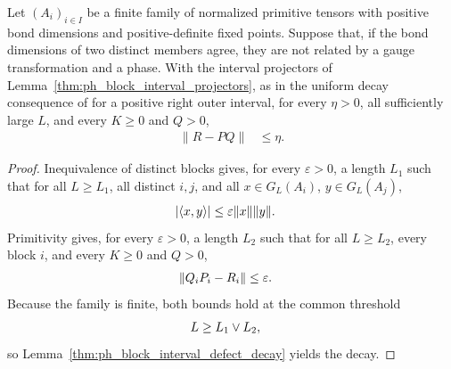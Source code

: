 \begin{lemma}
    \label{thm:ph_primitive_block_interval_defect_decay}
    \leanok
    Let $(A_i)_{i\in I}$ be a finite family of normalized primitive tensors
    with positive bond dimensions and positive-definite fixed points.
    Suppose that, if the bond dimensions of two distinct members agree, they
    are not related by a gauge transformation and a phase. With the interval
    projectors of Lemma~\ref{thm:ph_block_interval_projectors}, as in the
    uniform decay consequence of
    \cite[Lemma~6.1(ii)]{Nachtergaele1996Spectral} for a positive right outer
    interval, for every $\eta>0$, all sufficiently large $L$, and every
    $K\geq0$ and $Q>0$,
    \begin{align}
        \lVert R-PQ\rVert & \leq\eta.
    \end{align}
\end{lemma}
\begin{proof}
    \leanok
    Inequivalence of distinct blocks gives, for every $\varepsilon>0$, a
    length $L_1$ such that for all $L\ge L_1$, all distinct $i,j$, and all
    $x\in G_L(A_i)$, $y\in G_L(A_j)$,
    \begin{align}
        |\langle x,y\rangle|
         & \le\varepsilon\lVert x\rVert\lVert y\rVert.
        \notag
    \end{align}
    Primitivity gives, for every $\varepsilon>0$, a length $L_2$ such that
    for all $L\ge L_2$, every block $i$, and every $K\ge0$ and $Q>0$,
    \begin{align}
        \lVert Q_iP_i-R_i\rVert & \le\varepsilon.
        \notag
    \end{align}
    Because the family is finite, both bounds hold at the common threshold
    \begin{align}
        L & \ge L_1\vee L_2,
        \notag
    \end{align}
    so Lemma~\ref{thm:ph_block_interval_defect_decay} yields the decay.
\end{proof}

